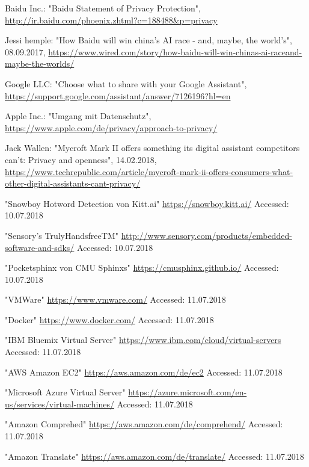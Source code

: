\documentclass[journal]{IEEEtran}
\begin{document}
\begin{thebibliography}{1}
Baidu Inc.: "Baidu Statement of Privacy Protection", \url{http://ir.baidu.com/phoenix.zhtml?c=188488&p=privacy}


Jessi hemple: "How Baidu will win china's AI race - and, maybe, the world's", 08.09.2017, \url{https://www.wired.com/story/how-baidu-will-win-chinas-ai-raceand-maybe-the-worlds/}


Google LLC: "Choose what to share with your Google Assistant", \url{https://support.google.com/assistant/answer/7126196?hl=en}

Apple Inc.: "Umgang mit Datenschutz", \url{https://www.apple.com/de/privacy/approach-to-privacy/}

Jack Wallen: "Mycroft Mark II offers something its digital assistant competitors can't: Privacy and openness", 14.02.2018, \url{https://www.techrepublic.com/article/mycroft-mark-ii-offers-consumers-what-other-digital-assistants-cant-privacy/}
	
	
"Snowboy Hotword Detection von Kitt.ai"
\url{https://snowboy.kitt.ai/}
Accessed: 10.07.2018

"Sensory's TrulyHandsfreeTM"
\url{http://www.sensory.com/products/embedded-software-and-sdks/}
Accessed: 10.07.2018

"Pocketsphinx von CMU Sphinxs"
\url{https://cmusphinx.github.io/}
Accessed: 10.07.2018

"VMWare"
\url{https://www.vmware.com/}
Accessed: 11.07.2018

"Docker"
\url{https://www.docker.com/}
Accessed: 11.07.2018

"IBM Bluemix Virtual Server"
\url{https://www.ibm.com/cloud/virtual-servers}
Accessed: 11.07.2018

"AWS Amazon EC2"
\url{https://aws.amazon.com/de/ec2}
Accessed: 11.07.2018

"Microsoft Azure Virtual Server"
\url{https://azure.microsoft.com/en-us/services/virtual-machines/}
Accessed: 11.07.2018

"Amazon Comprehed"
\url{https://aws.amazon.com/de/comprehend/}
Accessed: 11.07.2018

"Amazon Translate"
\url{https://aws.amazon.com/de/translate/}
Accessed: 11.07.2018


\end{thebibliography}
\end{document}
